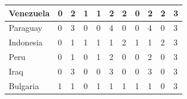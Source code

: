 \documentclass[12pt]{article}  %
\begin{document}
\begin{subappendices}
\begin{longtable}{|l|l|l|l|l|l|l|l|l|l|l|}
	\hline
	Venezuela                                                      & 0                                                 & 2                                                 & 1                                                 & 1                                                 & 2                                                 & 2                                                 & 0    & 2      & 2      & 3      \\ 
	\hline
	Paraguay                                                       & 0                                                 & 3                                                 & 0                                                 & 0                                                 & 4                                                 & 0                                                 & 0    & 4      & 0      & 3      \\ 
	\hline
	Indonesia                                                      & 0                                                 & 1                                                 & 1                                                 & 1                                                 & 1                                                 & 2                                                 & 1    & 1      & 2      & 3      \\ 
	\hline
	Peru                                                           & 0                                                 & 1                                                 & 0                                                 & 1                                                 & 2                                                 & 0                                                 & 0    & 2      & 0      & 3      \\ 
	\hline
	Iraq                                                           & 0                                                 & 3                                                 & 0                                                 & 0                                                 & 3                                                 & 0                                                 & 0    & 3      & 0      & 3      \\ 
	\hline
	Bulgaria                                                       & 1                                                 & 1                                                 & 0                                                 & 1                                                 & 1                                                 & 1                                                 & 1    & 1      & 0      & 3      \\ 

\end{longtable}
\end{subappendices}
\end{document}
